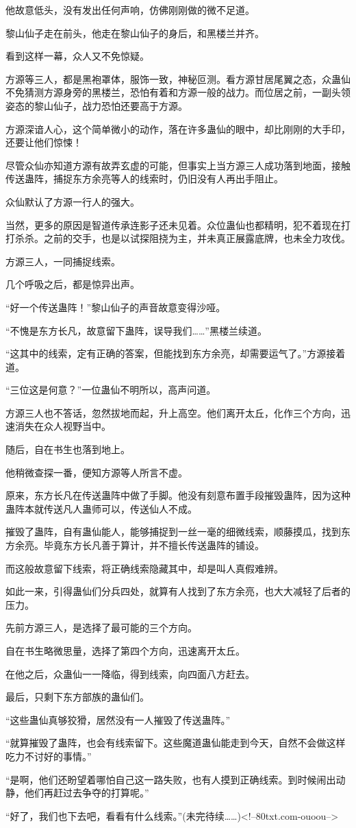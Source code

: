 \begin{this_body}
他故意低头，没有发出任何声响，仿佛刚刚做的微不足道。

黎山仙子走在前头，他走在黎山仙子的身后，和黑楼兰并齐。

看到这样一幕，众人又不免惊疑。

方源等三人，都是黑袍罩体，服饰一致，神秘叵测。看方源甘居尾翼之态，众蛊仙不免猜测方源身旁的黑楼兰，恐怕有着和方源一般的战力。而位居之前，一副头领姿态的黎山仙子，战力恐怕还要高于方源。

方源深谙人心，这个简单微小的动作，落在许多蛊仙的眼中，却比刚刚的大手印，还要让他们惊悚！

尽管众仙亦知道方源有故弄玄虚的可能，但事实上当方源三人成功落到地面，接触传送蛊阵，捕捉东方余亮等人的线索时，仍旧没有人再出手阻止。

众仙默认了方源一行人的强大。

当然，更多的原因是智道传承连影子还未见着。众位蛊仙也都精明，犯不着现在打打杀杀。之前的交手，也是以试探阻挠为主，并未真正展露底牌，也未全力攻伐。

方源三人，一同捕捉线索。

几个呼吸之后，都是惊异出声。

“好一个传送蛊阵！”黎山仙子的声音故意变得沙哑。

“不愧是东方长凡，故意留下蛊阵，误导我们……”黑楼兰续道。

“这其中的线索，定有正确的答案，但能找到东方余亮，却需要运气了。”方源接着道。

“三位这是何意？”一位蛊仙不明所以，高声问道。

方源三人也不答话，忽然拔地而起，升上高空。他们离开太丘，化作三个方向，迅速消失在众人视野当中。

随后，自在书生也落到地上。

他稍微查探一番，便知方源等人所言不虚。

原来，东方长凡在传送蛊阵中做了手脚。他没有刻意布置手段摧毁蛊阵，因为这种蛊阵本就传送凡人蛊师可以，传送仙人不成。

摧毁了蛊阵，自有蛊仙能人，能够捕捉到一丝一毫的细微线索，顺藤摸瓜，找到东方余亮。毕竟东方长凡善于算计，并不擅长传送蛊阵的铺设。

而这般故意留下线索，将正确线索隐藏其中，却是叫人真假难辨。

如此一来，引得蛊仙们分兵四处，就算有人找到了东方余亮，也大大减轻了后者的压力。

先前方源三人，是选择了最可能的三个方向。

自在书生略微思量，选择了第四个方向，迅速离开太丘。

在他之后，众蛊仙一一降临，得到线索，向四面八方赶去。

最后，只剩下东方部族的蛊仙们。

“这些蛊仙真够狡猾，居然没有一人摧毁了传送蛊阵。”

“就算摧毁了蛊阵，也会有线索留下。这些魔道蛊仙能走到今天，自然不会做这样吃力不讨好的事情。”

“是啊，他们还盼望着哪怕自己这一路失败，也有人摸到正确线索。到时候闹出动静，他们再赶过去争夺的打算呢。”

“好了，我们也下去吧，看看有什么线索。”(未完待续……)<!--80txt.com-ouoou-->

\end{this_body}

